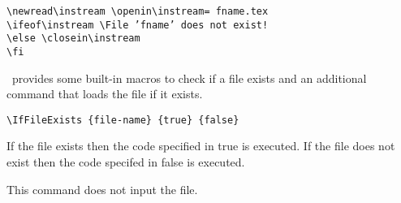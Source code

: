 \begin{verbatim}
\newread\instream \openin\instream= fname.tex
\ifeof\instream \File ’fname’ does not exist!
\else \closein\instream 
\fi
\end{verbatim}

\latex\ provides some built-in macros to check if a file exists and an additional command that
loads the file if it exists.

\begin{verbatim}
\IfFileExists {file-name} {true} {false}
\end{verbatim}

If the file exists then the code specified in true is executed.
If the file does not exist then the code specifed in false is executed.

This command does not input the file.

